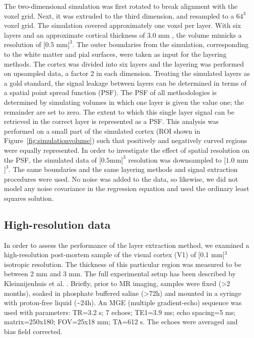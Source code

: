 The two-dimensional simulation was first rotated to break alignment with the voxel grid. Next, it was extruded to the third dimension, and resampled to a $64^3$ voxel grid. The simulation covered approximately one voxel per layer. With six layers and an approximate cortical thickness of 3.0 mm \cite{Zilles1990,Fischl2000}, the volume mimicks a resolution of $[0.5$ mm$]^3$. The outer boundaries from the simulation, corresponding to the white matter and pial surfaces, were taken as input for the layering methods. The cortex was divided into six layers and the layering was performed on upsampled data, a factor 2 in each dimension. Treating the simulated layers as a gold standard, the signal leakage between layers can be determined in terms of a spatial point spread function (PSF). The PSF of all methodologies is determined by simulating volumes in which one layer is given the value one; the remainder are set to zero. The extent to which this single layer signal can be retrieved in the correct layer is represented as a PSF. This analysis was performed on a small part of the simulated cortex (ROI shown in Figure~\ref{fig:simulationvolume}) such that positively and negatively curved regions were equally represented. In order to investigate the effect of spatial resolution on the PSF, the simulated data of $[0.5 $mm$]^3$ resolution was downsampled to $[1.0$ mm$]^3$. The same boundaries and the same layering methods and signal extraction procedures were used. No noise was added to the data, so likewise, we did not model any noise covariance in the regression equation and used the ordinary least squares solution.


\subsection{High-resolution data}
In order to assess the performance of the layer extraction method, we examined a high-resolution post-mortem sample of the visual cortex (V1) of [0.1 mm]$^3$ isotropic resolution. The thickness of this particular region was measured to be between 2 mm and 3 mm. The full experimental setup has been described by Kleinnijenhuis et al. \cite{Kleinnijenhuis2013}. Briefly, prior to MR imaging, samples were fixed (>2 months), soaked in phosphate buffered saline (>72h) and mounted in a syringe with proton-free liquid (\textasciitilde 24h). An MGE (multiple gradient-echo) sequence was used with parameters: TR=3.2 s; 7 echoes; TE1=3.9 ms; echo spacing=5 ms; matrix=250x180; FOV=25x18 mm; TA=612 s. The echoes were averaged and bias field corrected.

